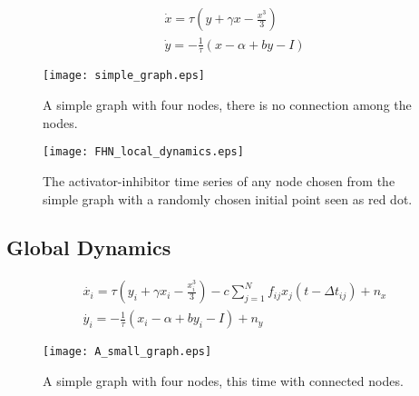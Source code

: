 \documentclass[12pt]{article}
\begin{document}
\begin{subequations}
 \begin{align}\dot{x} = \tau (y + \gamma x - \frac{x^3}{3})  \label{eqn: frobenius 17}\\  \dot{y} = -\frac{1}{\tau} (x - \alpha + b y - I ) \label{eqn: frobenius 18}   \end{align} 
\end{subequations}

\begin{figure}[h!]
	\centering
	\texttt{[image: simple\_graph.eps]}
		\caption{A simple graph with four nodes, there is no connection among the nodes.}
\end{figure}


\begin{figure}[h!]
	\centering
	\texttt{[image: FHN\_local\_dynamics.eps]}
		\caption{The activator-inhibitor time series of any node chosen from the simple graph with a randomly chosen initial point seen as red dot.}
\end{figure}

\newpage

\subsection{Global Dynamics}

\begin{subequations}
 \begin{align}\dot{x_i} = \tau (y_i + \gamma x_i - \frac{x_i^3}{3}) -c \sum_{j=1}^N f_{ij}x_j(t - \Delta t_{ij}) +n_x \label{eqn: frobenius 17}\\  \dot{y_i} = -\frac{1}{\tau} (x_i - \alpha + b y_i - I ) +n_y \label{eqn: frobenius 18}   \end{align} 
\end{subequations}


\begin{figure}[h!]
	\centering
	\texttt{[image: A\_small\_graph.eps]}
		\caption{A simple graph with four nodes, this time with connected nodes.}
\end{figure}
\end{document}
